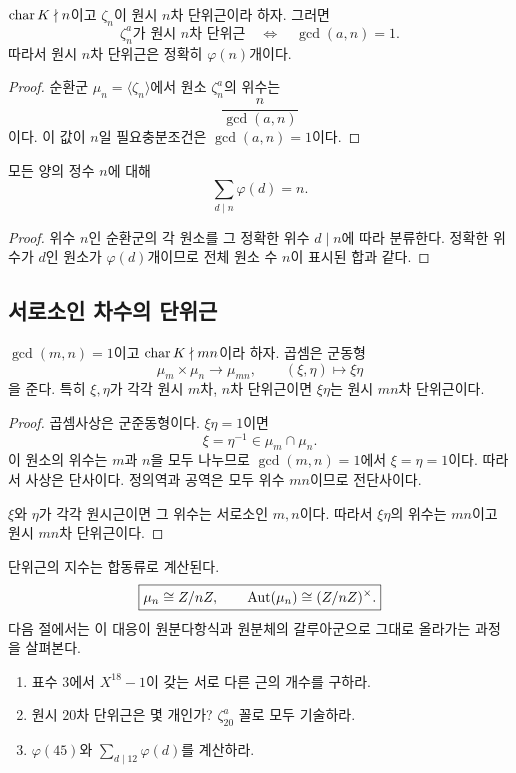 \begin{theorem}[원시 단위근의 개수]
\label{thm:number-primitive-roots-unity}
$\operatorname{char} K\nmid n$이고 $\zeta_n$이 원시 $n$차 단위근이라 하자. 그러면
\[
  \zeta_n^a\text{가 원시 }n\text{차 단위근}
  \quad\Longleftrightarrow\quad
  \gcd(a,n)=1.
\]
따라서 원시 $n$차 단위근은 정확히 $\varphi(n)$개이다.
\end{theorem}

\begin{proof}
순환군 $\mu_n=\langle\zeta_n\rangle$에서 원소 $\zeta_n^a$의 위수는
\[
  \frac{n}{\gcd(a,n)}
\]
이다. 이 값이 $n$일 필요충분조건은 $\gcd(a,n)=1$이다.
\end{proof}

\begin{corollary}
모든 양의 정수 $n$에 대해
\[
  \boxed{\sum_{d\mid n}\varphi(d)=n}.
\]
\end{corollary}

\begin{proof}
위수 $n$인 순환군의 각 원소를 그 정확한 위수 $d\mid n$에 따라 분류한다. 정확한 위수가 $d$인 원소가 $\varphi(d)$개이므로 전체 원소 수 $n$이 표시된 합과 같다.
\end{proof}

\subsection{서로소인 차수의 단위근}

\begin{proposition}
\label{prop:coprime-roots-unity-product}
$\gcd(m,n)=1$이고 $\operatorname{char} K\nmid mn$이라 하자. 곱셈은 군동형
\[
  \mu_m\times\mu_n\longrightarrow\mu_{mn},
  \qquad(\xi,\eta)\longmapsto\xi\eta
\]
을 준다. 특히 $\xi,\eta$가 각각 원시 $m$차, $n$차 단위근이면 $\xi\eta$는 원시 $mn$차 단위근이다.
\end{proposition}

\begin{proof}
곱셈사상은 군준동형이다. $\xi\eta=1$이면
\[
  \xi=\eta^{-1}\in\mu_m\cap\mu_n.
\]
이 원소의 위수는 $m$과 $n$을 모두 나누므로 $\gcd(m,n)=1$에서 $\xi=\eta=1$이다. 따라서 사상은 단사이다. 정의역과 공역은 모두 위수 $mn$이므로 전단사이다.

$\xi$와 $\eta$가 각각 원시근이면 그 위수는 서로소인 $m,n$이다. 따라서 $\xi\eta$의 위수는 $mn$이고 원시 $mn$차 단위근이다.
\end{proof}

\begin{keyidea}
단위근의 지수는 합동류로 계산된다.
\[
  \boxed{
  \mu_n\cong Z/nZ,
  \qquad
  \operatorname{Aut}(\mu_n)
  \cong(Z/nZ)^\times.}
\]
다음 절에서는 이 대응이 원분다항식과 원분체의 갈루아군으로 그대로 올라가는 과정을 살펴본다.
\end{keyidea}

\begin{checkpoint}
\begin{enumerate}[label=(\alph*)]
  \item 표수 $3$에서 $X^{18}-1$이 갖는 서로 다른 근의 개수를 구하라.
  \item 원시 $20$차 단위근은 몇 개인가? $\zeta_{20}^a$ 꼴로 모두 기술하라.
  \item $\varphi(45)$와 $\sum_{d\mid12}\varphi(d)$를 계산하라.
\end{enumerate}
\end{checkpoint}

